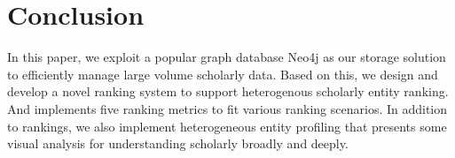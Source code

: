 \section{Conclusion}
\label{sec-conc}

 In this paper, we exploit a popular graph database Neo4j as our storage solution to efficiently manage large volume scholarly data. 
Based on this, we design and develop a novel ranking system \oursystem to support heterogenous scholarly entity ranking. And \oursystem implements five ranking metrics to fit various ranking scenarios. In addition to rankings, we also implement heterogeneous entity profiling that presents some visual analysis for understanding scholarly broadly and deeply.







